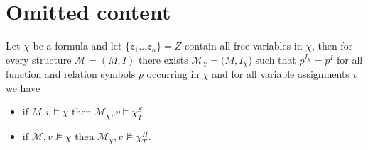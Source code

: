 \documentclass[runningheads]{llncs}
\begin{document}



\appendix

\section{Omitted content}

\begin{lemma}\label{ap1}
Let $\chi$ be a formula and let $\{z_1\dots z_n\} = Z$ contain all free variables in $\chi$, then for every structure $\mathcal M = (M, I)$ there exists $\mathcal M_\chi = (M, I_\chi$) such that $p^{I_{\chi}} = p^I$ for all function and relation symbols $p$ occurring in $\chi$ and for all variable assignments $v$ we have
	\begin{itemize}
		\item if $M, v \models\chi$ then $\mathcal M_\chi, v\models\chi^S_T$.
		\item if $\mathcal M, v\not\models\chi$ then $\mathcal M_\chi, v\not\models\chi^H_T$.
	\end{itemize}
\end{lemma}
\end{document}
